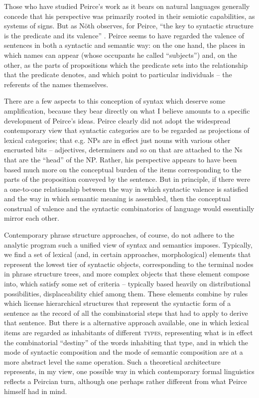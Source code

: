 \documentclass[output=paper,colorlinks,citecolor=brown]{langscibook}
\begin{document}
Those who have studied Peirce's work as
it bears on natural languages generally concede that his perspective was primarily
rooted in their semiotic capabilities, as systems of signs. But as
Nöth observes, for Peirce, ``the key to syntactic structure is the
predicate and its valence'' \citeyearpar[7]{nothPeirce}. Peirce
seems to have regarded the valence of sentences in both a syntactic
and semantic way: on the one hand, the places in which names can
appear (whose occupants he called ``subjects'') and, on the other, as the
parts of propositions which the predicate sets into the relationship
that the predicate denotes, and which point to particular
individuals -- the referents of the names themselves.

There are a few aspects to this conception of syntax which deserve
some amplification, because they bear directly on what I believe
amounts to a specific development of Peirce's ideas. Peirce clearly
did not adopt the widespread contemporary view that syntactic
categories are to be regarded as projections of lexical categories;
that e.g. NPs are in effect just nouns with various other encrusted
bits -- adjectives, determiners and so on that are attached to the Ns
that are the ``head'' of the NP. Rather, his perspective appears to have been
based much more on the conceptual burden of the items corresponding to
the parts of the proposition conveyed by the sentence. But in
principle, if there were a one-to-one relationship between the way in
which syntactic valence is satisfied and the way in which semantic
meaning is assembled, then the conceptual construal of valence and the
syntactic combinatorics of language would essentially mirror each
other.

Contemporary phrase structure approaches, of course, do not adhere to
the analytic program such a unified view of syntax and semantics
imposes. Typically, we find a set of lexical (and, in certain
approaches, morphological) elements that represent the lowest tier of
syntactic objects, corresponding to the terminal nodes in phrase
structure trees, and more complex objects that these element compose
into, which satisfy some set of criteria -- typically based heavily on
distributional possibilities, displaceability chief among them. These
elements combine by rules which license hierarchical structures that
represent the syntactic form of a sentence as the record of all the
combinatorial steps that had to apply to derive that sentence.  But
there is a alternative approach available, one in which lexical items
are regarded as inhabitants of different \textsc{types}, representing what
is in effect the combinatorial ``destiny'' of the words inhabiting that
type, and in which the mode of syntactic composition and the mode of
semantic composition are at a more abstract level the same
operation. Such a theoretical architecture represents, in my view, one
possible way in which contemporary formal linguistics reflects a
Peircian turn, although one perhaps rather different from what Peirce
himself had in mind.
\end{document}
